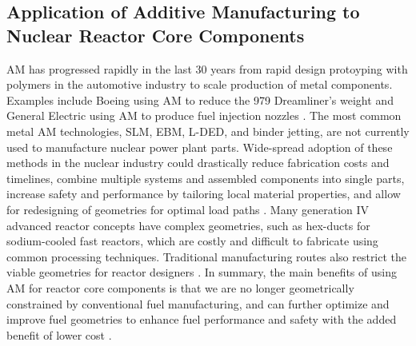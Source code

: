 \subsection{Application of Additive Manufacturing to Nuclear Reactor Core Components}
\label{sec:am}
\gls{AM} has progressed rapidly in the last 30 years from rapid design protoyping 
with polymers in the automotive industry to scale production of metal components.  
Examples include Boeing using \gls{AM} to reduce the 979 Dreamliner's weight 
\cite{noauthor_printed_2017} and General Electric using \gls{AM} to produce fuel 
injection nozzles \cite{noauthor_transformation_2018}. 
The most common metal \gls{AM} technologies, \gls{SLM}, \gls{EBM}, \gls{L-DED}, 
and binder jetting, are not currently used to manufacture nuclear power plant parts. 
Wide-spread adoption of these methods in the nuclear industry could drastically 
reduce fabrication costs and timelines, combine multiple systems and assembled 
components into single parts, increase safety and performance by tailoring 
local material properties, and allow for redesigning of geometries for optimal 
load paths \cite{simpson_considerations_2019}. 
Many generation IV advanced reactor concepts have complex geometries, 
such as hex-ducts for sodium-cooled fast reactors, which are costly and difficult 
to fabricate using common processing techniques. 
Traditional manufacturing routes also restrict the viable geometries for 
reactor designers \cite{sridharan_performance_2019}. 
In summary, the main benefits of using \gls{AM} for reactor core components is that 
we are no longer geometrically constrained by conventional fuel manufacturing, 
and can further optimize and improve fuel geometries to enhance fuel performance and 
safety with the added benefit of lower cost \cite{bergeron_early_2018}. 

